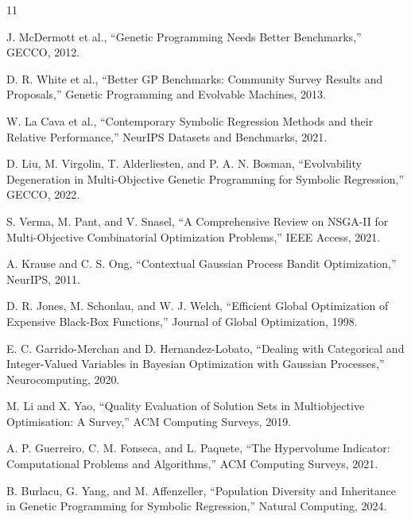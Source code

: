 \documentclass[a4paper,10pt,twocolumn]{ltjsarticle}
\begin{document}
\begin{thebibliography}{11}

J. McDermott et al.,
``Genetic Programming Needs Better Benchmarks,''
GECCO, 2012.

D. R. White et al.,
``Better GP Benchmarks: Community Survey Results and Proposals,''
Genetic Programming and Evolvable Machines, 2013.

W. La Cava et al.,
``Contemporary Symbolic Regression Methods and their Relative Performance,''
NeurIPS Datasets and Benchmarks, 2021.

D. Liu, M. Virgolin, T. Alderliesten, and P. A. N. Bosman,
``Evolvability Degeneration in Multi-Objective Genetic Programming for Symbolic Regression,''
GECCO, 2022.

S. Verma, M. Pant, and V. Snasel,
``A Comprehensive Review on NSGA-II for Multi-Objective Combinatorial Optimization Problems,''
IEEE Access, 2021.

A. Krause and C. S. Ong,
``Contextual Gaussian Process Bandit Optimization,''
NeurIPS, 2011.

D. R. Jones, M. Schonlau, and W. J. Welch,
``Efficient Global Optimization of Expensive Black-Box Functions,''
Journal of Global Optimization, 1998.

E. C. Garrido-Merchan and D. Hernandez-Lobato,
``Dealing with Categorical and Integer-Valued Variables in Bayesian Optimization with Gaussian Processes,''
Neurocomputing, 2020.

M. Li and X. Yao,
``Quality Evaluation of Solution Sets in Multiobjective Optimisation: A Survey,''
ACM Computing Surveys, 2019.

A. P. Guerreiro, C. M. Fonseca, and L. Paquete,
``The Hypervolume Indicator: Computational Problems and Algorithms,''
ACM Computing Surveys, 2021.

B. Burlacu, G. Yang, and M. Affenzeller,
``Population Diversity and Inheritance in Genetic Programming for Symbolic Regression,''
Natural Computing, 2024.

\end{thebibliography}
\end{document}
